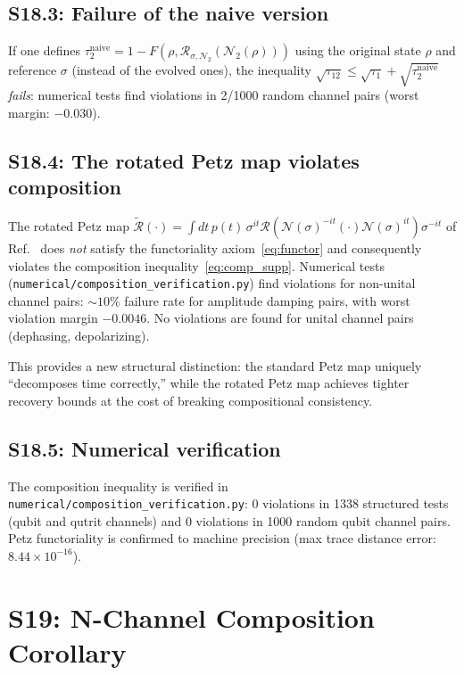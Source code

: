 \documentclass[prl,twocolumn,superscriptaddress,longbibliography]{revtex4-2}
\newcommand{\Petz}{\mathcal{R}}
\newcommand{\chan}{\mathcal{N}}
\newcommand{\tauasym}{\tau}
\begin{document}
\subsection{S18.3: Failure of the naive version}

If one defines $\tauasym_2^{\mathrm{naive}}
= 1 - F(\rho,\Petz_{\sigma,\chan_2}(\chan_2(\rho)))$
using the original state $\rho$ and reference $\sigma$
(instead of the evolved ones), the inequality
$\sqrt{\tauasym_{12}} \leq \sqrt{\tauasym_1}
+ \sqrt{\tauasym_2^{\mathrm{naive}}}$ \emph{fails}:
numerical tests find violations in 2/1000 random channel
pairs (worst margin: $-0.030$).

\subsection{S18.4: The rotated Petz map violates composition}

The rotated Petz map
$\tilde{\Petz}(\cdot) = \int dt\,p(t)\,
\sigma^{it}\Petz(\chan(\sigma)^{-it}(\cdot)
\chan(\sigma)^{it})\sigma^{-it}$
of Ref.~\cite{Junge2018} does \emph{not} satisfy the
functoriality axiom~\eqref{eq:functor} and consequently
violates the composition
inequality~\eqref{eq:comp_supp}.  Numerical tests
(\texttt{numerical/composition\_verification.py}) find
violations for non-unital channel pairs: $\sim\!10\%$ failure
rate for amplitude damping pairs, with worst violation margin
$-0.0046$.  No violations are found for unital channel pairs
(dephasing, depolarizing).

This provides a new structural distinction: the standard Petz
map uniquely ``decomposes time correctly,'' while the rotated
Petz map achieves tighter recovery bounds at the cost of
breaking compositional consistency.

\subsection{S18.5: Numerical verification}

The composition inequality is verified in
\texttt{numerical/composition\_verification.py}:
0 violations in 1338 structured tests (qubit and qutrit
channels) and 0 violations in 1000 random qubit channel pairs.
Petz functoriality is confirmed to machine precision
(max trace distance error: $8.44\times10^{-16}$).

\section{S19: N-Channel Composition Corollary}
\label{sec:S19}
\end{document}
